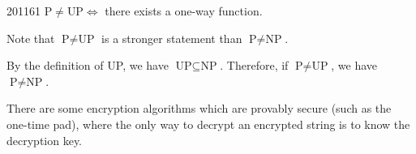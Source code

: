 \documentclass[10pt,\jkfside,a4paper]{article}
\begin{document}
\begin{examquestion}{2011}{6}{1}
$\text{P} \ne \text{UP} \iff $ there exists a one-way function.

Note that $\text{P} \ne \text{UP}$ is a stronger statement than $\text{P} \ne \text{NP}$.

By the definition of UP, we have $\text{UP} \subseteq \text{NP}$. Therefore,
if $\text{P} \ne \text{UP}$, we have $\text{P} \ne \text{NP}$.

There are some encryption algorithms which are provably secure (such as the
one-time pad), where the only way to decrypt an encrypted string is to know
the decryption key.

\end{examquestion}
\end{document}
